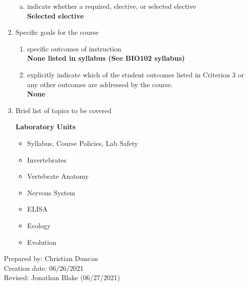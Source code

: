 \begin{enumerate}[1.]
\begin{enumerate}[a.]
\item indicate whether a required, elective, or selected elective\\ %
  {\bfseries
    Selected elective
  }

\end{enumerate}

\item Specific goals for the course
\begin{enumerate}
\item specific outcomes of instruction\\ %
  {\bfseries
    None listed in syllabus (See BIO102 syllabus)
  }

\item explicitly indicate which of the student outcomes listed in Criterion 3 or any other outcomes are addressed by the course.\\
  {\bfseries
    None
  }
\end{enumerate}

\item Brief list of topics to be covered\\
  {\bfseries
    Laboratory Units
    \begin{itemize}
      \item Syllabus, Course Policies, Lab Safety
      \item Invertebrates
      \item Vertebrate Anatomy
      \item Nervous System
      \item ELISA
      \item Ecology
      \item Evolution
    \end{itemize}
  }

\end{enumerate}

\noindent Prepared by: Christian Duncan\\
\noindent Creation date: 06/26/2021\\
\noindent Revised: Jonathan Blake (06/27/2021)\\
